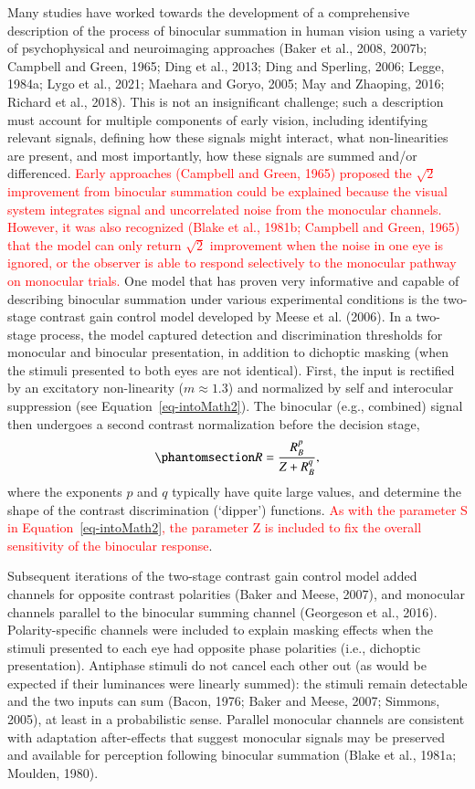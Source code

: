 \documentclass[review,
  12pt,
]{elsarticle}
\begin{document}
Many studies have worked towards the development of a comprehensive
description of the process of binocular summation in human vision using
a variety of psychophysical and neuroimaging approaches (Baker et al.,
2008, 2007b; Campbell and Green, 1965; Ding et al., 2013; Ding and
Sperling, 2006; Legge, 1984a; Lygo et al., 2021; Maehara and Goryo,
2005; May and Zhaoping, 2016; Richard et al., 2018). This is not an
insignificant challenge; such a description must account for multiple
components of early vision, including identifying relevant signals,
defining how these signals might interact, what non-linearities are
present, and most importantly, how these signals are summed and/or
differenced. \textcolor{red}{Early approaches (Campbell and Green, 1965)
proposed the \(\sqrt{2}\) improvement from binocular summation could be
explained because the visual system integrates signal and uncorrelated
noise from the monocular channels. However, it was also recognized
(Blake et al., 1981b; Campbell and Green, 1965) that the model can only
return \(\sqrt{2}\) improvement when the noise in one eye is ignored, or
the observer is able to respond selectively to the monocular pathway on
monocular trials.} One model that has proven very informative and
capable of describing binocular summation under various experimental
conditions is the two-stage contrast gain control model developed by
Meese et al. (2006). In a two-stage process, the model captured
detection and discrimination thresholds for monocular and binocular
presentation, in addition to dichoptic masking (when the stimuli
presented to both eyes are not identical). First, the input is rectified
by an excitatory non-linearity (\(m \approx 1.3\)) and normalized by
self and interocular suppression (see Equation~\ref{eq-intoMath2}). The
binocular (e.g., combined) signal then undergoes a second contrast
normalization before the decision stage,
\begin{equation}\phantomsection\label{eq-IntroMathSecondStage}{
R = \frac{R_B^p}{Z + R_B^q},
}\end{equation} where the exponents \(p\) and \(q\) typically have quite
large values, and determine the shape of the contrast discrimination
(`dipper') functions. \textcolor{red}{As with the parameter S in
Equation~\ref{eq-intoMath2}, the parameter Z is included to fix the
overall sensitivity of the binocular response}.

Subsequent iterations of the two-stage contrast gain control model added
channels for opposite contrast polarities (Baker and Meese, 2007), and
monocular channels parallel to the binocular summing channel (Georgeson
et al., 2016). Polarity-specific channels were included to explain
masking effects when the stimuli presented to each eye had opposite
phase polarities (i.e., dichoptic presentation). Antiphase stimuli do
not cancel each other out (as would be expected if their luminances were
linearly summed): the stimuli remain detectable and the two inputs can
sum (Bacon, 1976; Baker and Meese, 2007; Simmons, 2005), at least in a
probabilistic sense. Parallel monocular channels are consistent with
adaptation after-effects that suggest monocular signals may be preserved
and available for perception following binocular summation (Blake et
al., 1981a; Moulden, 1980).
\end{document}
